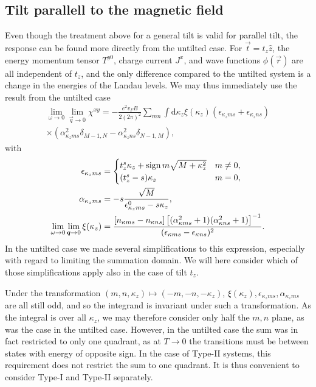 \subsection{Tilt parallell to the magnetic field}
Even though the treatment above for a general tilt is valid for parallel tilt, the response can be found more directly from the untilted case.
For \( \vec{t} = t_z \hat{z} \), the energy momentum tensor \( T^{y 0} \), charge current \( J^x \), and wave functions \( \phi(\vec{r}) \) are all independent of \( t_z \), and the only difference compared to the untilted system is a change in the energies of the Landau levels.
We may thus immediately use the result from the untilted case
\begin{multline}
  \label{eq:120}
  \lim_{\omega \to 0} \lim_{\vec{q} \to 0} \chi^{xy} =
  - \frac{e^2 v_F B}{2 (2\pi)^2}
  \sum\limits_{mn} \int \mathrm{d} \kappa_z
  \xi(\kappa_z)
  (\epsilon_{\kappa_z m s} + \epsilon_{\kappa_z n s})\\
  \times (\alpha_{\kappa_z m s}^2 \delta_{M-1, N} - \alpha_{\kappa_z n s}^2 \delta_{N-1, M}),
\end{multline}
with
\begin{align}
  \label{eq:121}
  \epsilon_{\kappa_z m s} &=
                          \begin{cases}
                            t_z^s \kappa_z + \operatorname{sign}{m} \sqrt{M + \kappa_z^2} & m \neq 0,\\
                            (t_z^s - s) \kappa_z & m = 0,
                          \end{cases}\\
  \alpha_{\kappa_z m s} &=
                          -s \frac{\sqrt{M}}{\epsilon_{\kappa_z  m s}^0 - s \kappa_z },\\
  \lim_{\omega \to 0} \lim_{\bm{q} \to 0}\xi(\kappa_z) &= \frac{[n_{\kappa ms} - n_{\kappa ns}]
  \left[ (\alpha_{\kappa ms}^2 + 1) (\alpha_{\kappa ns}^2 + 1) \right]^{-1}
  }{
    (\epsilon _{\kappa m s} - \epsilon _{\kappa n s})^2
  }.
\end{align}
In the untilted case we made several simplifications to this expression, especially with regard to limiting the summation domain.
We will here consider which of those simplifications apply also in the case of tilt \( t_z \).

Under the transformation \( (m,n,\kappa_z) \mapsto (-m, -n , -\kappa_z) \), \( \xi(\kappa_z), \epsilon_{\kappa_z m s}, \alpha_{\kappa_z m s} \) are all still odd, and so the integrand is invariant under such a transformation.
As the integral is over all \( \kappa_z \), we may therefore consider only half the \( m,n \) plane, as was the case in the untilted case.
However, in the untilted case the sum was in fact restricted to only one quadrant, as at \( T\to 0 \) the transitions must be between states with energy of opposite sign.
In the case of Type-II systems, this requirement does not restrict the sum to one quadrant.
It is thus convenient to consider Type-I and Type-II separately.

